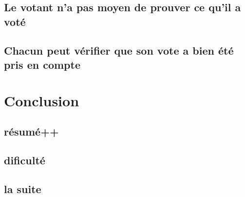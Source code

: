 \documentclass[../report]{subfiles}
\begin{document}
\section{Le votant n'a pas moyen de prouver ce qu'il a voté}
\todo{}
\section{Chacun peut vérifier que son vote a bien été pris en compte}
\todo{}

\chapter{Conclusion}
\todo{}

\section{résumé++}
\section{dificulté}
\section{la suite}
\end{document}

